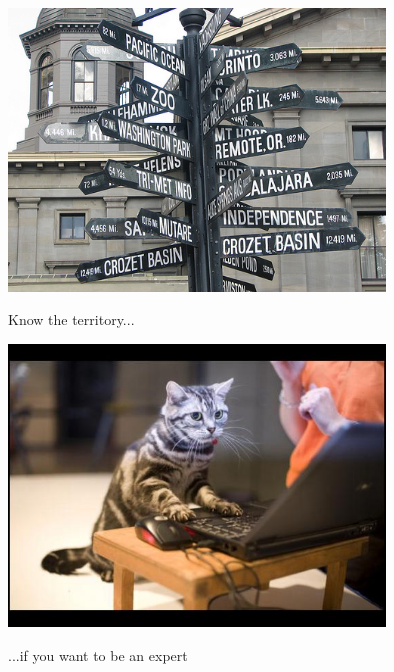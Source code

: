 \documentclass{beamer}
\begin{document}
\begin{frame}
  \begin{center}
    \includegraphics[width=0.75\textwidth]{../img/road-sign}

    Know the territory...
  \end{center}
\end{frame}

\begin{frame}
  \begin{center}
    \includegraphics[width=0.75\textwidth]{../img/cat-expert}

    ...if you want to be an expert
  \end{center}
\end{frame}
\end{document}
